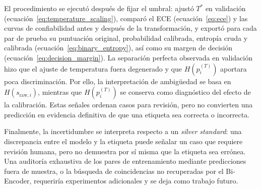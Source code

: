 El procedimiento se ejecutó después de fijar el umbral: ajustó $T^*$ en validación (ecuación~\ref{eq:temperature_scaling}), comparó el ECE (ecuación~\ref{eq:ece}) y las curvas de confiabilidad antes y después de la transformación, y exportó para cada par de prueba su puntuación original, probabilidad calibrada, entropía cruda y calibrada (ecuación~\ref{eq:binary_entropy}), así como su margen de decisión (ecuación~\ref{eq:decision_margin}). La separación perfecta observada en validación hizo que el ajuste de temperatura fuera degenerado y que $H(p_i^{(T)})$ aportara poca discriminación. Por ello, la interpretación de ambigüedad se basa en $H(s_{\mathrm{raw},i})$, mientras que $H(p_i^{(T)})$ se conserva como diagnóstico del efecto de la calibración. Estas señales ordenan casos para revisión, pero no convierten una predicción en evidencia definitiva de que una etiqueta sea correcta o incorrecta.

Finalmente, la incertidumbre se interpreta respecto a un \textit{silver standard}: una discrepancia entre el modelo y la etiqueta puede señalar un caso que requiere revisión humana, pero no demuestra por sí misma que la etiqueta sea errónea. Una auditoría exhaustiva de los pares de entrenamiento mediante predicciones fuera de muestra, o la búsqueda de coincidencias no recuperadas por el Bi-Encoder, requeriría experimentos adicionales y se deja como trabajo futuro.
